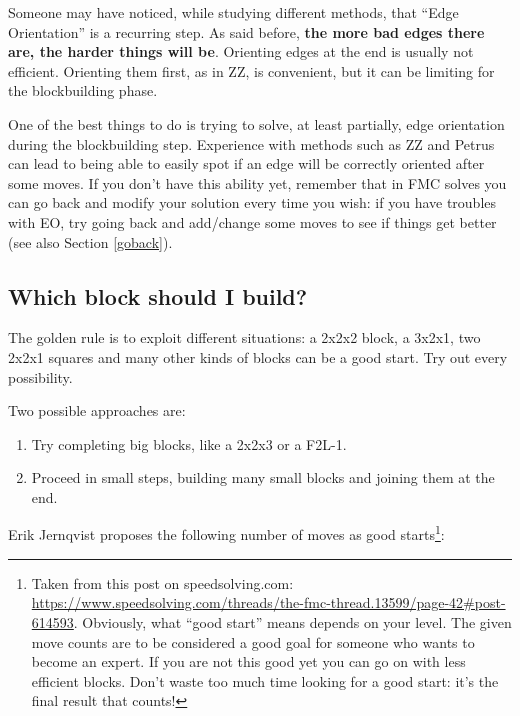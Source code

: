 \documentclass[11pt,a4paper]{book}
\begin{document}
Someone may have noticed, while studying different methods, that “Edge Orientation” is a recurring step. As said before, \textbf{the more bad edges there are, the harder things will be}. Orienting edges at the end is usually not efficient. Orienting them first, as in ZZ, is convenient, but it can be limiting for the blockbuilding phase.

One of the best things to do is trying to solve, at least partially, edge orientation during the blockbuilding step. Experience with methods such as ZZ and Petrus can lead to being able to easily spot if an edge will be correctly oriented after some moves. If you don't have this ability yet, remember that in FMC solves you can go back and modify your solution every time you wish: if you have troubles with EO, try going back and add/change some moves to see if things get better (see also Section \ref{goback}).


\subsection{Which block should I build?}

The golden rule is to exploit different situations: a 2x2x2 block, a 3x2x1, two 2x2x1 squares and many other kinds of blocks can be a good start. Try out every possibility.

Two possible approaches are:
\begin{enumerate}
\item Try completing big blocks, like a 2x2x3 or a F2L-1.
\item Proceed in small steps, building many small blocks and joining them at the end.
\end{enumerate}

Erik Jernqvist proposes the following number of moves as good starts\footnote{Taken from this post on speedsolving.com: \url{https://www.speedsolving.com/threads/the-fmc-thread.13599/page-42\#post-614593}. Obviously, what ``good start'' means depends on your level. The given move counts are to be considered a good goal for someone who wants to become an expert. If you are not this good yet you can go on with less efficient blocks. Don't waste too much time looking for a good start: it's the final result that counts!}:
\end{document}
